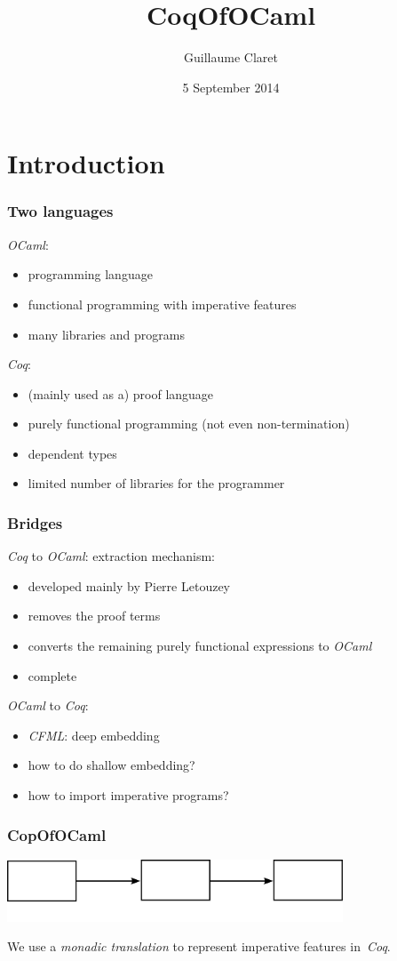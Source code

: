 \documentclass[hyperref={pdfpagelabels=false}]{beamer}
\begin{document}
  \title{CoqOfOCaml}
  \author{Guillaume Claret}
  \date{5 September 2014}
  \maketitle

  \section{Introduction}
  \begin{frame}
    \frametitle{Two languages}
    \emph{OCaml}:
    \begin{itemize}
      \item programming language
      \item functional programming with imperative features
      \item many libraries and programs
    \end{itemize}
    \emph{Coq}:
    \begin{itemize}
      \item (mainly used as a) proof language
      \item purely functional programming (not even non-termination)
      \item dependent types
      \item limited number of libraries for the programmer
    \end{itemize}
  \end{frame}
  \begin{frame}
    \frametitle{Bridges}
    \emph{Coq} to \emph{OCaml}: extraction mechanism:
    \begin{itemize}
      \item developed mainly by Pierre Letouzey
      \item removes the proof terms
      \item converts the remaining purely functional expressions to \emph{OCaml}
      \item complete
    \end{itemize}
    \emph{OCaml} to \emph{Coq}:
    \begin{itemize}
      \item \emph{CFML}: deep embedding
      \item how to do shallow embedding?
      \item how to import imperative programs?
    \end{itemize}
  \end{frame}
  \begin{frame}
    \frametitle{CopOfOCaml}
    \begin{center}
      \includegraphics[width=10cm]{images/compilation_chain}
    \end{center}
    We use a \emph{monadic translation} to represent imperative features in~\emph{Coq}.
  \end{frame}
\end{document}
